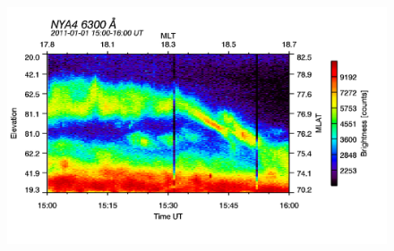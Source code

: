 \begin{figure}
\begin{minipage}{0.49\textwidth}
\end{minipage}
\begin{minipage}{0.49\textwidth}
\includegraphics[width=1\linewidth]{Figures/Allsky/6300/nya4_20110101_1500_1600_6300_cal.png}
\end{minipage}
\end{figure}
